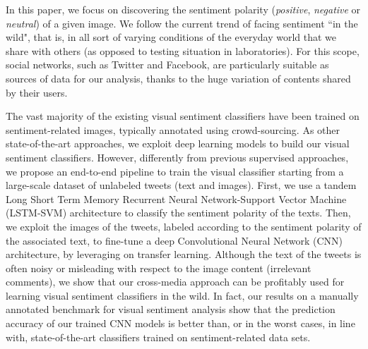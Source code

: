 In this paper, we focus on discovering the sentiment polarity (\textit{positive}, \textit{negative} or \textit{neutral}) of a given image.
We follow the current trend of facing sentiment ``in the wild", that is, in all sort of varying conditions of the everyday world that we share with others (as opposed to testing situation in laboratories).
For this scope, social networks, such as Twitter and Facebook, are particularly suitable as sources of data for our analysis, thanks to the huge variation of contents shared by their users.

The vast majority of the existing visual sentiment classifiers have been trained on sentiment-related images, typically annotated using crowd-sourcing. %
As other state-of-the-art approaches, we exploit deep learning models to build our visual sentiment classifiers.
However, differently from previous supervised approaches, we propose an end-to-end pipeline to train the visual classifier starting from a large-scale dataset of unlabeled tweets (text and images). %
First, we use a tandem Long Short Term Memory Recurrent Neural Network-Support Vector Machine (LSTM-SVM) architecture to classify the sentiment polarity of the texts.
Then, we exploit the images of the tweets, labeled according to the sentiment polarity of the associated text, to fine-tune a deep Convolutional Neural Network (CNN) architecture, by leveraging on transfer learning.
Although the text of the tweets is often noisy or misleading with respect to the image content (\eg irrelevant comments), we show that our cross-media approach can be profitably used for learning visual sentiment classifiers in the wild.
In fact, our results on a manually annotated benchmark for visual sentiment analysis %
show that the prediction accuracy of our trained CNN models is better than, or in the worst cases, in line with, state-of-the-art classifiers trained on sentiment-related data sets. %

